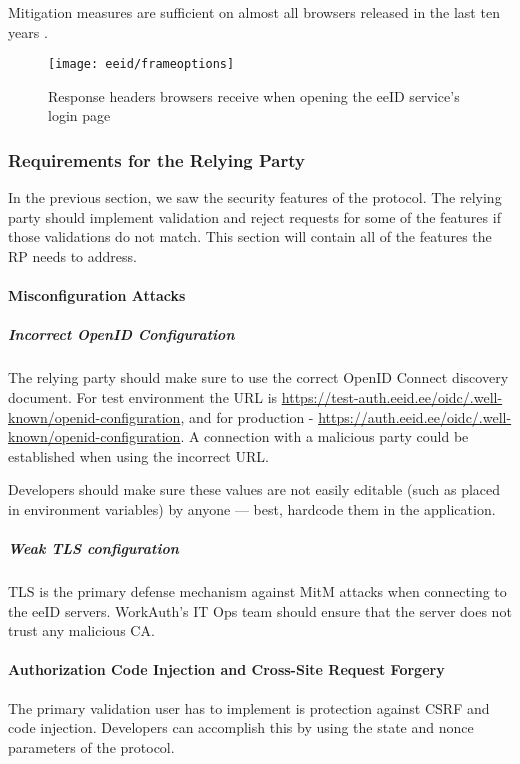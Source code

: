 Mitigation measures are sufficient on almost all browsers released in the last ten years \cite{caniuse-xframeoptions}.

\begin{figure}
  \centering
  \texttt{[image: eeid/frameoptions]}
  \caption{Response headers browsers receive when opening the eeID service's login page}
  \label{fig:eeid-responseheaders}
\end{figure}

\subsubsection{Requirements for the Relying Party}

In the previous section, we saw the security features of the protocol. The relying party should implement validation and reject requests for some of the features if those validations do not match. This section will contain all of the features the RP needs to address.

\paragraph{Misconfiguration Attacks}

\subparagraph{Incorrect OpenID Configuration}

The relying party should make sure to use the correct OpenID Connect discovery document. For test environment the URL is \url{https://test-auth.eeid.ee/oidc/.well-known/openid-configuration}, and for production - \url{https://auth.eeid.ee/oidc/.well-known/openid-configuration}. A connection with a malicious party could be established when using the incorrect URL.

Developers should make sure these values are not easily editable (such as placed in environment variables) by anyone — best, hardcode them in the application.

\subparagraph{Weak TLS configuration}

TLS is the primary defense mechanism against MitM attacks when connecting to the eeID servers. WorkAuth's IT Ops team should ensure that the server does not trust any malicious CA.

\paragraph{Authorization Code Injection and Cross-Site Request Forgery}

The primary validation user has to implement is protection against CSRF and code injection. Developers can accomplish this by using the state and nonce parameters of the protocol.


